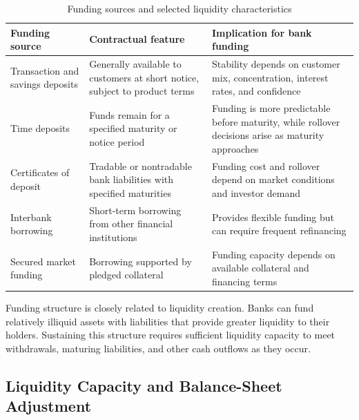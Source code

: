 \begin{table}[H]

\centering

\caption{Funding sources and selected liquidity characteristics}

\label{tab:ch12-bank-funding-characteristics}

\begin{tabularx}{0.92\textwidth}{@{}p{} X X@{}}

\toprule

\textbf{Funding source} &
\textbf{Contractual feature} &
\textbf{Implication for bank funding} \\

\midrule

Transaction and savings deposits &
Generally available to customers at short notice, subject to product terms &
Stability depends on customer mix, concentration, interest rates, and confidence \\

Time deposits &
Funds remain for a specified maturity or notice period &
Funding is more predictable before maturity, while rollover decisions arise as maturity approaches \\

Certificates of deposit &
Tradable or nontradable bank liabilities with specified maturities &
Funding cost and rollover depend on market conditions and investor demand \\

Interbank borrowing &
Short-term borrowing from other financial institutions &
Provides flexible funding but can require frequent refinancing \\

Secured market funding &
Borrowing supported by pledged collateral &
Funding capacity depends on available collateral and financing terms \\

\bottomrule

\end{tabularx}

\end{table}

Funding structure is closely related to liquidity creation. Banks can fund relatively illiquid assets with liabilities that provide greater liquidity to their holders. Sustaining this structure requires sufficient liquidity capacity to meet withdrawals, maturing liabilities, and other cash outflows as they occur.

\subsection{Liquidity Capacity and Balance-Sheet Adjustment}

